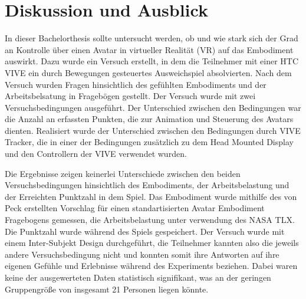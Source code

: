 \chapter{Diskussion und Ausblick}
In dieser Bachelorthesis sollte untersucht werden, ob und wie stark sich der Grad an Kontrolle über einen Avatar in virtueller Realität (VR) auf das Embodiment auswirkt. Dazu wurde ein Versuch erstellt, in dem die Teilnehmer mit einer HTC VIVE ein durch Bewegungen gesteuertes Ausweichspiel absolvierten. Nach dem Versuch wurden Fragen hinsichtlich des gefühlten Embodiments und der Arbeitsbelsatung in Fragebögen gestellt. 
Der Versuch wurde mit zwei Versuchsbedingungen ausgeführt. Der Unterschied zwischen den Bedingungen war die Anzahl an erfassten Punkten, die zur Animation und Steuerung des Avatars dienten. Realisiert wurde der Unterschied zwischen den Bedingungen durch VIVE Tracker, die in einer der Bedingungen zusätzlich zu dem Head Mounted Display und den Controllern der VIVE verwendet wurden.

Die Ergebnisse zeigen keinerlei Unterschiede zwischen den beiden Versuchsbedingungen hinsichtlich des Embodiments, der Arbeitsbelastung und der Erreichten Punktzahl in dem Spiel. Das Embodiment wurde mithilfe des von Peck erstellten Vorschlag für einen standartisierten Avatar Embodiment Fragebogens gemessen, die Arbeitsbelastung unter verwendung des NASA TLX. Die Punktzahl wurde während des Spiels gespeichert. Der Versuch wurde mit einem Inter-Subjekt Design durchgeführt, die Teilnehmer kannten also die jeweils andere Versuchsbedingung nicht und konnten somit ihre Antworten auf ihre eigenen Gefühle und Erlebnisse während des Experiments beziehen. Dabei waren keine der ausgewerteten Daten statistisch signifikant, was an der geringen Gruppengröße von insgesamt 21 Personen liegen könnte.

